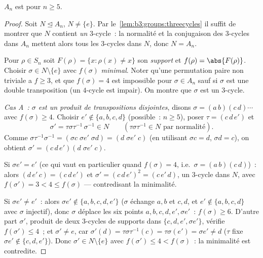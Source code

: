 \begin{theorem}\label{thm:b3:groups:ansimple}
$A_n$ est  pour $n \geq 5$.
\end{theorem}

\begin{proof}
Soit $N \trianglelefteq A_n$, $N \neq \{e\}$. Par
le~\cref{lem:b3:groups:threecycles} il suffit de montrer que $N$
contient \emph{un} $3$-cycle~: la normalité et la conjugaison des
$3$-cycles dans $A_n$ mettent alors tous les $3$-cycles dans $N$,
donc $N = A_n$.

Pour $\rho \in S_n$ soit $F(\rho) = \{x : \rho(x) \neq x\}$ son
\emph{support} et $f(\rho) = \abs{F(\rho)}$. Choisir $\sigma \in N
\setminus \{e\}$ avec $f(\sigma)$ \emph{minimal}. Noter qu'une
permutation paire non triviale a $f \geq 3$, et que $f(\sigma) =
4$ est impossible pour $\sigma \in A_n$ sauf si $\sigma$ est une
double transposition (un $4$-cycle est impair). On montre que
$\sigma$ est un $3$-cycle.

\emph{Cas A~: $\sigma$ est un produit de transpositions
disjointes}, disons $\sigma = (a\,b)(c\,d)\cdots$ avec $f(\sigma)
\geq 4$. Choisir $e' \notin \{a, b, c, d\}$ (possible~: $n \geq
5$), poser $\tau = (c\,d\,e')$ et
\[
\sigma' = \tau\sigma\tau^{-1}\,\sigma^{-1} \in N
\qquad (\tau\sigma\tau^{-1} \in N \text{ par normalité}).
\]
Comme $\sigma\tau^{-1}\sigma^{-1} = (\sigma c\;\sigma e'\;\sigma
d) = (d\;\sigma e'\;c)$ (en utilisant $\sigma c = d$, $\sigma d =
c$), on obtient $\sigma' = (c\,d\,e')(d\;\sigma e'\;c)$.

Si $\sigma e' = e'$ (ce qui vaut en particulier quand $f(\sigma) =
4$, i.e.\ $\sigma = (a\,b)(c\,d)$)~: alors $(d\,e'\,c) =
(c\,d\,e')$ et $\sigma' = (c\,d\,e')^2 = (c\,e'\,d)$, un
$3$-cycle dans $N$, avec $f(\sigma') = 3 < 4 \leq f(\sigma)$ ---
contredisant la minimalité.

Si $\sigma e' \neq e'$~: alors $\sigma e' \notin \{a, b, c, d,
e'\}$ ($\sigma$ échange $a,b$ et $c,d$, et $e' \notin \{a,b,c,d\}$
avec $\sigma$ injectif), donc $\sigma$ déplace les six points $a,
b, c, d, e', \sigma e'$~: $f(\sigma) \geq 6$. D'autre part
$\sigma'$, produit de deux $3$-cycles de supports dans $\{c, d,
e', \sigma e'\}$, vérifie $f(\sigma') \leq 4$~; et $\sigma' \neq
e$, car $\sigma'(d) = \tau\sigma\tau^{-1}(c) = \tau\sigma(e') =
\sigma e' \neq d$ ($\tau$ fixe $\sigma e' \notin \{c,d,e'\}$).
Donc $\sigma' \in N \setminus\{e\}$ avec $f(\sigma') \leq 4 <
f(\sigma)$~: la minimalité est contredite.


\end{proof}
